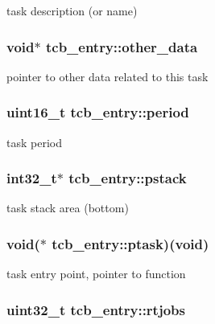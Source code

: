 task description (or name) \hypertarget{structtcb__entry_accd675f017bb0ec5ae63b4d729bd73aa}{
\subsubsection[{other\-\_\-data}]{\setlength{\rightskip}{0pt plus 5cm}void$\ast$ tcb\-\_\-entry\-::other\-\_\-data}}\label{structtcb__entry_accd675f017bb0ec5ae63b4d729bd73aa}
pointer to other data related to this task \hypertarget{structtcb__entry_a85e14b4c040e0535b45b52a7ee7c9a94}{
\subsubsection[{period}]{\setlength{\rightskip}{0pt plus 5cm}uint16\-\_\-t tcb\-\_\-entry\-::period}}\label{structtcb__entry_a85e14b4c040e0535b45b52a7ee7c9a94}
task period \hypertarget{structtcb__entry_a0434be5f20d1645ab2804b7ee5c95fc9}{
\subsubsection[{pstack}]{\setlength{\rightskip}{0pt plus 5cm}int32\-\_\-t$\ast$ tcb\-\_\-entry\-::pstack}}\label{structtcb__entry_a0434be5f20d1645ab2804b7ee5c95fc9}
task stack area (bottom) \hypertarget{structtcb__entry_a7ed7f2d228da0039f065f0c8a756b46d}{
\subsubsection[{ptask}]{\setlength{\rightskip}{0pt plus 5cm}void($\ast$ tcb\-\_\-entry\-::ptask)(void)}}\label{structtcb__entry_a7ed7f2d228da0039f065f0c8a756b46d}
task entry point, pointer to function \hypertarget{structtcb__entry_a51802bc7ba3ee4cfcbcbfb404e606643}{
\subsubsection[{rtjobs}]{\setlength{\rightskip}{0pt plus 5cm}uint32\-\_\-t tcb\-\_\-entry\-::rtjobs}}\label{structtcb__entry_a51802bc7ba3ee4cfcbcbfb404e606643}
